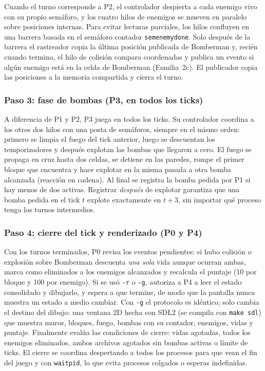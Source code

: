\documentclass[11pt,a4paper]{article}
\newcommand{\cod}[1]{\texttt{#1}}
\renewcommand{\_}{\textunderscore\allowbreak}
\begin{document}
Cuando el turno corresponde a P2, el controlador despierta a cada enemigo vivo con su propio semáforo, y los cuatro hilos de enemigos se mueven en paralelo sobre posiciones internas. Para evitar lecturas parciales, los hilos confluyen en una barrera basada en el semáforo contador \cod{sem\_enemy\_done}. Solo después de la barrera el rastreador copia la última posición publicada de Bomberman y, recién cuando termina, el hilo de colisión compara coordenadas y publica un evento si algún enemigo está en la celda de Bomberman (Familia~2c). El publicador copia las posiciones a la memoria compartida y cierra el turno.

\subsubsection{Paso 3: fase de bombas (P3, en todos los ticks)}
A diferencia de P1 y P2, P3 juega en todos los ticks. Su controlador coordina a los otros dos hilos con una posta de semáforos, siempre en el mismo orden: primero se limpia el fuego del tick anterior, luego se descuentan los temporizadores y después explotan las bombas que llegaron a cero. El fuego se propaga en cruz hasta dos celdas, se detiene en las paredes, rompe el primer bloque que encuentra y hace explotar en la misma pasada a otra bomba alcanzada (reacción en cadena). Al final se registra la bomba pedida por P1 si hay menos de dos activas. Registrar \emph{después} de explotar garantiza que una bomba pedida en el tick $t$ explote exactamente en $t+3$, sin importar qué proceso tenga los turnos intermedios.

\subsubsection{Paso 4: cierre del tick y renderizado (P0 y P4)}
Con los turnos terminados, P0 revisa los eventos pendientes: si hubo colisión o explosión sobre Bomberman descuenta \emph{una sola} vida aunque ocurran ambas, marca como eliminados a los enemigos alcanzados y recalcula el puntaje (10 por bloque y 100 por enemigo). Si se usó \cod{-r} o \cod{-g}, autoriza a P4 a leer el estado consolidado y dibujarlo, y espera a que termine, de modo que la pantalla nunca muestra un estado a medio cambiar. Con \cod{-g} el protocolo es idéntico; solo cambia el destino del dibujo: una ventana 2D hecha con SDL2 (se compila con \cod{make sdl}) que muestra muros, bloques, fuego, bombas con su contador, enemigos, vidas y puntaje. Finalmente evalúa las condiciones de cierre: vidas agotadas, todos los enemigos eliminados, ambos archivos agotados sin bombas activas o límite de ticks. El cierre se coordina despertando a todos los procesos para que vean el fin del juego y con \cod{waitpid}, lo que evita procesos colgados o esperas indefinidas.
\end{document}
